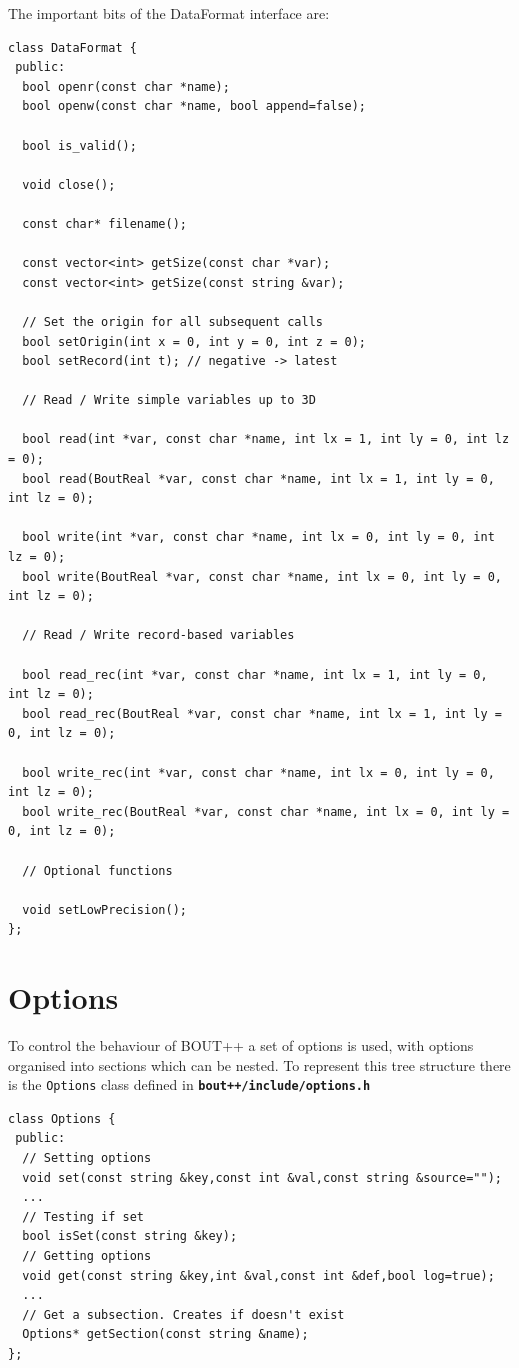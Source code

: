 \documentclass[12pt]{article}
\newcommand{\file}[1]{\texttt{\bf #1}}
\begin{document}
The important bits of the DataFormat interface are: 
\begin{lstlisting}
class DataFormat {
 public:
  bool openr(const char *name);
  bool openw(const char *name, bool append=false);
  
  bool is_valid();
  
  void close();
  
  const char* filename();

  const vector<int> getSize(const char *var);
  const vector<int> getSize(const string &var);

  // Set the origin for all subsequent calls
  bool setOrigin(int x = 0, int y = 0, int z = 0); 
  bool setRecord(int t); // negative -> latest
  
  // Read / Write simple variables up to 3D

  bool read(int *var, const char *name, int lx = 1, int ly = 0, int lz = 0);
  bool read(BoutReal *var, const char *name, int lx = 1, int ly = 0, int lz = 0);

  bool write(int *var, const char *name, int lx = 0, int ly = 0, int lz = 0);
  bool write(BoutReal *var, const char *name, int lx = 0, int ly = 0, int lz = 0);

  // Read / Write record-based variables

  bool read_rec(int *var, const char *name, int lx = 1, int ly = 0, int lz = 0);
  bool read_rec(BoutReal *var, const char *name, int lx = 1, int ly = 0, int lz = 0);

  bool write_rec(int *var, const char *name, int lx = 0, int ly = 0, int lz = 0);
  bool write_rec(BoutReal *var, const char *name, int lx = 0, int ly = 0, int lz = 0);

  // Optional functions
  
  void setLowPrecision();
};
\end{lstlisting}

\section{Options}
To control the behaviour of BOUT++ a set of options is used, with
options organised into sections which can be nested. To represent this
tree structure there is the \lstinline!Options! class defined in
\file{bout++/include/options.h} 
\begin{lstlisting}
class Options {
 public:
  // Setting options
  void set(const string &key,const int &val,const string &source="");
  ...
  // Testing if set
  bool isSet(const string &key);
  // Getting options
  void get(const string &key,int &val,const int &def,bool log=true);
  ...
  // Get a subsection. Creates if doesn't exist
  Options* getSection(const string &name);
};
\end{lstlisting}
\end{document}
